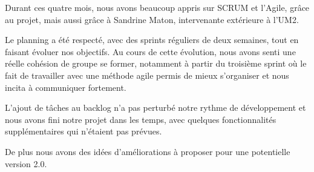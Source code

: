 Durant ces quatre mois, nous avons beaucoup appris sur SCRUM et l'Agile, grâce au projet, mais aussi grâce à Sandrine Maton, intervenante extérieure à l'UM2.

Le planning a été respecté, avec des sprints réguliers de deux semaines, tout en faisant évoluer nos objectifs.
Au cours de cette évolution, nous avons senti une réelle cohésion de groupe se former, notamment à partir du troisième sprint où le fait de travailler avec une méthode agile permis de mieux s'organiser et nous incita à communiquer fortement.

L'ajout de tâches au backlog n'a pas perturbé notre rythme de développement et nous avons fini notre projet dans les temps, avec quelques fonctionnalités supplémentaires qui n'étaient pas prévues.

De plus nous avons des idées d'améliorations à proposer pour une potentielle version 2.0.
